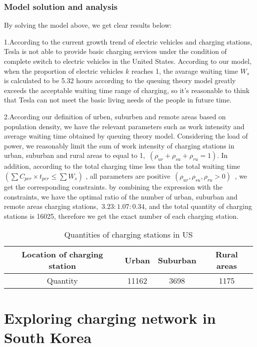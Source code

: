 \documentclass[12pt]{article}  %
\begin{document}
\subsubsection{Model solution and analysis}
By solving the model above, we get clear results below:

1.According to the current growth trend of electric vehicles and charging stations, Tesla is not able to provide basic charging services under the condition of complete switch to electric vehicles in the United States.
According to our model, when the proportion of electric vehicles ${k}$ reaches 1, the avarage waiting time ${W_s}$ is calculated to be 5.32 hours according to the queuing theory model greatly exceeds the acceptable waiting time range of charging, so it's reasonable to think that Tesla can not meet the basic living needs of the people in future time.

2.According our definition of urben, suburben and remote areas based on population density, we have the relevant parameters such as work intensity and average waiting time obtained by queuing theory model.
Considering the load of power, we reasonably limit the sum of work intensity of charging stations in urban, suburban and rural areas to  equal to 1,\ ${(\rho _{ur} + {\rho _{su}} + {\rho _{ru}} = 1)}$. In addition, according to the total charging time less than the total waiting time
${(\sum {{C_{per}}}  \times {t_{per}} \le \sum {{W_s}}) }$
, all parameters are positive\ ${({\rho _{ur}},{\rho _{su}},{\rho _{ru}} > 0)}$\ , we get the corresponding constraints.
by combining the expression with the constraints, we have the optimal ratio of the number of urban, suburban and remote areas charging stations,\ ${3.23:1.07:0.34 }$, and the total quantity of charging stations is 16025, therefore we get the exact number of each charging station.
\begin{table}[H]
\begin{center}
\caption{Quantities of charging stations in US}
\begin{tabular}{cccc}
	\toprule
	Location of charging station & Urban & Suburban & Rural areas\\
	\midrule
	Quantity & 11162 & 3698 & 1175\\
	\bottomrule
\end{tabular}\label{tb:2}
\end{center}
\end{table}

\section{Exploring charging network in South Korea}
\end{document}
